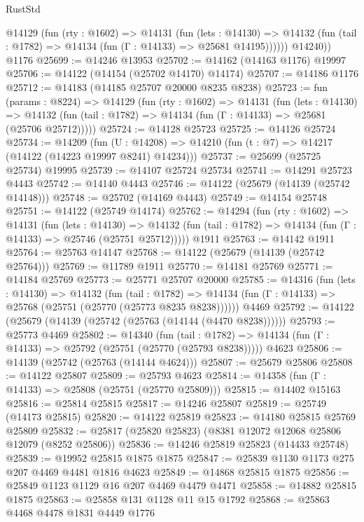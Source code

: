 \begin{lexlean}{RustStd}
\begin{coremodule}
          @14129
            (fun (rty : @1602) =>
            @14131
              (fun (lets : @14130) =>
              @14132 (fun (tail : @1782) => @14134 (fun (Γ : @14133) => @25681 @14195))))))
        @14240))
    @1176
@25699 := @14246 @13953
@25702 := @14162 (@14163 @1176) @19997
@25706 := @14122 (@14154 (@25702 @14170) @14174)
@25707 := @14186 @1176
@25712 := @14183 (@14185 @25707 @20000 @8235 @8238)
@25723 := fun (params : @8224) =>
  @14129
    (fun (rty : @1602) =>
    @14131
      (fun (lets : @14130) =>
      @14132 (fun (tail : @1782) => @14134 (fun (Γ : @14133) => @25681 (@25706 @25712)))))
@25724 := @14128 @25723
@25725 := @14126 @25724
@25734 := @14209
    (fun (U : @14208) => @14210 (fun (t : @7) => @14217 (@14122 (@14223 @19997 @8241) @14234)))
@25737 := @25699 (@25725 @25734) @19995
@25739 := @14107 @25724 @25734
@25741 := @14291 @25723 @4443
@25742 := @14140 @4443
@25746 := @14122 (@25679 (@14139 (@25742 @14148)))
@25748 := @25702 (@14169 @4443)
@25749 := @14154 @25748
@25751 := @14122 (@25749 @14174)
@25762 := @14294
    (fun (rty : @1602) =>
    @14131
      (fun (lets : @14130) =>
      @14132 (fun (tail : @1782) => @14134 (fun (Γ : @14133) => @25746 (@25751 @25712)))))
    @1911
@25763 := @14142 @1911
@25764 := @25763 @14147
@25768 := @14122 (@25679 (@14139 (@25742 @25764)))
@25769 := @11789 @1911
@25770 := @14181 @25769
@25771 := @14184 @25769
@25773 := @25771 @25707 @20000
@25785 := @14316
    (fun (lets : @14130) =>
    @14132
      (fun (tail : @1782) =>
      @14134 (fun (Γ : @14133) => @25768 (@25751 (@25770 (@25773 @8235 @8238))))))
    @4469
@25792 := @14122 (@25679 (@14139 (@25742 (@25763 (@14144 (@4470 @8238))))))
@25793 := @25773 @4469
@25802 := @14340
    (fun (tail : @1782) => @14134 (fun (Γ : @14133) => @25792 (@25751 (@25770 (@25793 @8238)))))
    @4623
@25806 := @14139 (@25742 (@25763 (@14144 @4624)))
@25807 := @25679 @25806
@25808 := @14122 @25807
@25809 := @25793 @4623
@25814 := @14358 (fun (Γ : @14133) => @25808 (@25751 (@25770 @25809)))
@25815 := @14402 @15163
@25816 := @25814 @25815
@25817 := @14246 @25807
@25819 := @25749 (@14173 @25815)
@25820 := @14122 @25819
@25823 := @14180 @25815 @25769 @25809
@25832 := @25817 (@25820 @25823) (@8381 @12072 @12068 @25806 @12079 (@8252 @25806))
@25836 := @14246 @25819 @25823 (@14433 @25748)
@25839 := @19952 @25815 @1875 @1875
@25847 := @25839 @1130 @1173 @275 @207 @4469 @4481 @1816 @4623
@25849 := @14868 @25815 @1875
@25856 := @25849 @1123 @1129 @16 @207 @4469 @4479 @4471
@25858 := @14882 @25815 @1875
@25863 := @25858 @131 @1128 @11 @15 @1792
@25868 := @25863 @4468 @4478 @1831 @4449 @1776

\end{coremodule}
\end{lexlean}
